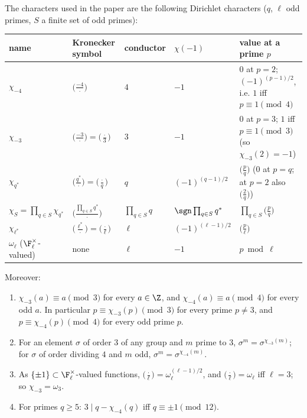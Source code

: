 \begin{proposition}\label{prop:rings:paper-characters}
The characters used in the paper are the following Dirichlet characters ($q$, $\ell$ odd primes, $S$ a finite set of odd primes):
\begin{center}
\footnotesize\setlength{\tabcolsep}{3pt}
\begin{tabular}{lll>{\raggedright\arraybackslash}p{2cm}>{\raggedright\arraybackslash}p{4.6cm}}
\toprule
name & Kronecker symbol & conductor & $\chi(-1)$ & value at a prime $p$\\
\midrule
$\chi_{-4}$ & $\bigl(\frac{-4}\cdot\bigr)$ & $4$ & $-1$ & $0$ at $p=2$; $(-1)^{(p-1)/2}$, i.e. $1$ iff $p\equiv1\pmod4$\\
$\chi_{-3}$ & $\bigl(\frac{-3}\cdot\bigr)=\bigl(\frac\cdot3\bigr)$ & $3$ & $-1$ & $0$ at $p=3$; $1$ iff $p\equiv1\pmod3$ (so $\chi_{-3}(2)=-1$)\\
$\chi_{q^*}$ & $\bigl(\frac{q^*}\cdot\bigr)=\bigl(\frac\cdot q\bigr)$ & $q$ & $(-1)^{(q-1)/2}$ & $\bigl(\frac pq\bigr)$ ($0$ at $p=q$; at $p=2$ also $\bigl(\frac2q\bigr)$)\\
$\chi_S=\prod_{q\in S}\chi_{q^*}$ & $\bigl(\frac{\prod_{q\in S}q^*}\cdot\bigr)$ & $\prod_{q\in S}q$ & $\sgn\prod_{q\in S}q^*$ & $\prod_{q\in S}\bigl(\frac pq\bigr)$\\
$\chi_{\ell^*}$ & $\bigl(\frac{\ell^*}\cdot\bigr)=\bigl(\frac\cdot\ell\bigr)$ & $\ell$ & $(-1)^{(\ell-1)/2}$ & $\bigl(\frac p\ell\bigr)$\\
$\omega_\ell$ ($\F_\ell^\times$-valued) & none & $\ell$ & $-1$ & $p\bmod\ell$\\
\bottomrule
\end{tabular}
\end{center}
Moreover:
\begin{enumerate}[label=(\roman*)]
\item $\chi_{-3}(a)\equiv a\pmod3$ for every $a\in\Z$, and $\chi_{-4}(a)\equiv a\pmod4$ for every odd $a$. In particular $p\equiv\chi_{-3}(p)\pmod3$ for every prime
$p\ne3$, and $p\equiv\chi_{-4}(p)\pmod4$ for every odd prime $p$.
\item For an element $\sigma$ of order $3$ of any group and $m$ prime to $3$, $\sigma^m=\sigma^{\chi_{-3}(m)}$; for $\sigma$ of order dividing $4$ and $m$ odd,
$\sigma^m=\sigma^{\chi_{-4}(m)}$.
\item As $\{\pm1\}\subset\F_\ell^\times$-valued functions, $\bigl(\frac\cdot\ell\bigr)=\omega_\ell^{(\ell-1)/2}$, and $\bigl(\frac\cdot\ell\bigr)=\omega_\ell$ iff $\ell=3$; so $\chi_{-3}=\omega_3$.
\item For primes $q\ge5$: $3\mid q-\chi_{-4}(q)$ iff $q\equiv\pm1\pmod{12}$.
\end{enumerate}
\end{proposition}

